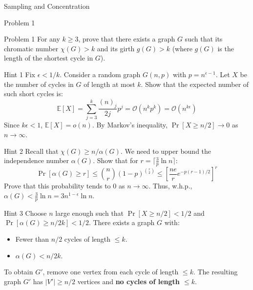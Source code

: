 \documentclass{beamer}
\begin{document}
\begin{section}{Sampling and Concentration}

\begin{subsection}{Problem 1}
    \begin{frame}
        \begin{block}{Problem 1}
            For any $k \ge 3$, prove that there exists a graph $G$ such that its chromatic number $\chi(G) > k$ and its girth $g(G) > k$ (where $g(G)$ is the length of the shortest cycle in $G$).
        \end{block}
    \end{frame}

    \begin{frame}
        \begin{block}{Hint 1}
            Fix $\epsilon < 1/k$. Consider a random graph $G(n, p)$ with $p = n^{\epsilon-1}$. 
            Let $X$ be the number of cycles in $G$ of length at most $k$. 
            Show that the expected number of such short cycles is:
            \[
                \mathbb{E}[X] = \sum_{j=3}^k \frac{(n)_j}{2j} p^j = \mathcal{O}(n^k p^k) = \mathcal{O}(n^{k\epsilon})
            \]
            Since $k\epsilon < 1$, $\mathbb{E}[X] = o(n)$. By Markov's inequality, $\Pr[X \ge n/2] \to 0$ as $n \to \infty$.
        \end{block}
    \end{frame}

    \begin{frame}
        \begin{block}{Hint 2}
            Recall that $\chi(G) \ge n/\alpha(G)$. We need to upper bound the independence number $\alpha(G)$. 
            Show that for $r = \lceil \frac{3}{p} \ln n \rceil$:
            \[
                \Pr[\alpha(G) \ge r] \le \binom{n}{r} (1-p)^{\binom{r}{2}} \le \left[ \frac{ne}{r} e^{-p(r-1)/2} \right]^r
            \]
            Prove that this probability tends to $0$ as $n \to \infty$. Thus, w.h.p., $\alpha(G) < \frac{3}{p} \ln n = 3 n^{1-\epsilon} \ln n$.
        \end{block}
    \end{frame}

    \begin{frame}
        \begin{block}{Hint 3}
            Choose $n$ large enough such that $\Pr[X \ge n/2] < 1/2$ and $\Pr[\alpha(G) \ge n/2k] < 1/2$. 
            There exists a graph $G$ with:
            \begin{itemize}
                \item Fewer than $n/2$ cycles of length $\le k$.
                \item $\alpha(G) < n/2k$.
            \end{itemize}
            To obtain $G'$, remove one vertex from each cycle of length $\le k$. 
            The resulting graph $G'$ has $|V'| \ge n/2$ vertices and \textbf{no cycles of length $\le k$}.
        \end{block}
    \end{frame} 


\end{subsection}
\end{section}
\end{document}
